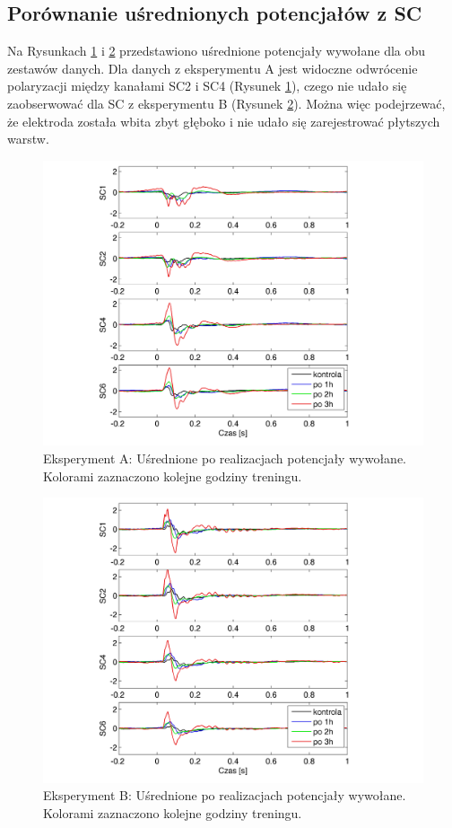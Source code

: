 \documentclass{pracamgr_2}
\begin{document}
	\subsection{Porównanie uśrednionych potencjałów z SC}\label{SC}
	Na Rysunkach \ref{rys:kontrola15_SC} i \ref{rys:beta3_SC} przedstawiono uśrednione potencjały wywołane dla obu zestawów danych. Dla danych z eksperymentu A jest widoczne odwrócenie polaryzacji między kanałami SC2 i SC4 (Rysunek \ref{rys:kontrola15_SC}), czego nie udało się zaobserwować dla SC z eksperymentu B (Rysunek \ref{rys:beta3_SC}). Można więc podejrzewać, że elektroda została wbita zbyt głęboko i nie udało się zarejestrować płytszych warstw.
	\begin{figure}[htbp]
		\begin{center}
			\includegraphics[scale=0.8]{kontrola15_SC.png}
		\end{center}
		\caption{Eksperyment A: Uśrednione po realizacjach potencjały wywołane. Kolorami zaznaczono kolejne godziny treningu.}
		\label{rys:kontrola15_SC}
	\end{figure}
	\begin{figure}[htbp]
		\begin{center}
			\includegraphics[scale=0.8]{beta3_SC.png}
		\end{center}
		\caption{Eksperyment B: Uśrednione po realizacjach potencjały wywołane. Kolorami zaznaczono kolejne godziny treningu.}
		\label{rys:beta3_SC}
	\end{figure}
\end{document}
